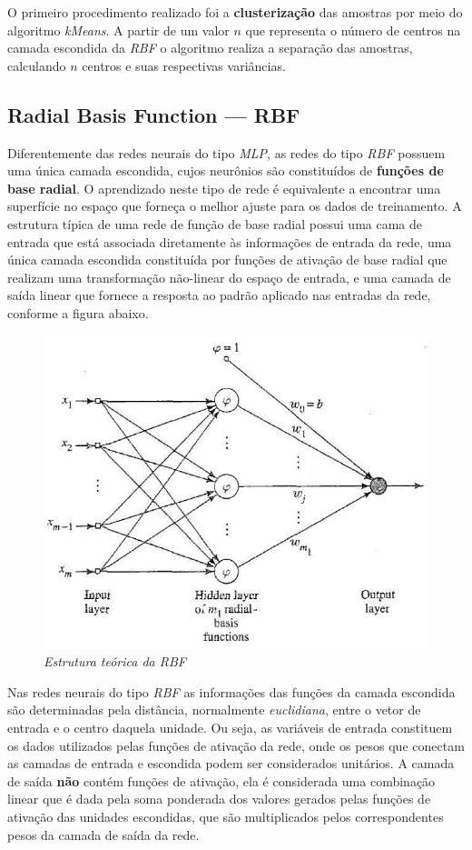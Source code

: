 \documentclass[10pt,twocolumn,letterpaper]{article}
\begin{document}
O primeiro procedimento realizado foi a \textbf{clusterização} das amostras por meio do algoritmo \textit{kMeans}. A partir de um valor $n$ que representa o número de centros na camada escondida da \textit{RBF} o algoritmo realiza a separação das amostras, calculando $n$ centros e suas respectivas variâncias.

\subsection{Radial Basis Function --- RBF}
Diferentemente das redes neurais do tipo \textit{MLP}, as redes do tipo \textit{RBF} possuem uma única camada escondida, cujos neurônios são constituídos de \textbf{funções de base radial}. O aprendizado neste tipo de rede é equivalente a encontrar uma superfície no espaço que forneça o melhor ajuste para os dados de treinamento. A estrutura típica de uma rede de função de base radial possui uma cama de entrada que está associada diretamente às informações de entrada da rede, uma única camada escondida constituída por funções de ativação de base radial que realizam uma transformação não-linear do espaço de entrada, e uma camada de saída linear que fornece a resposta ao padrão aplicado nas entradas da rede, conforme a figura abaixo.
\begin{figure}[h]
\begin{center}
\includegraphics[scale=0.3]{foto1.jpg}
\caption{\textit{Estrutura teórica da RBF}}
\end{center}
\end{figure}
Nas redes neurais do tipo \textit{RBF} as informações das funções da camada escondida são determinadas pela distância, normalmente \textit{euclidiana}, entre o vetor de entrada e o centro daquela unidade. Ou seja, as variáveis de entrada constituem os dados utilizados pelas funções de ativação da rede, onde os pesos que conectam as camadas de entrada e escondida podem ser considerados unitários.
A camada de saída \textbf{não} contém funções de ativação, ela é considerada uma combinação linear que é dada pela soma ponderada dos valores gerados pelas funções de ativação das unidades escondidas, que são multiplicados pelos correspondentes pesos da camada de saída da rede.
\end{document}
